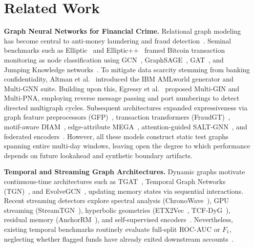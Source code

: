 \documentclass[sigconf,nonacm]{acmart}
\begin{document}
\section{Related Work}
\label{sec:related_work}

\textbf{Graph Neural Networks for Financial Crime.} Relational graph modeling has become central to anti-money laundering and fraud detection~\cite{ferretti2025aml,altman2023ibmaml,weber2019elliptic}. Seminal benchmarks such as Elliptic~\cite{weber2019elliptic} and Elliptic++~\cite{elmougy2023ellipticpp} framed Bitcoin transaction monitoring as node classification using GCN~\cite{kipf2017gcn}, GraphSAGE~\cite{hamilton2017sage}, GAT~\cite{velickovic2018gat}, and Jumping Knowledge networks~\cite{xu2018jk}. To mitigate data scarcity stemming from banking confidentiality, Altman et al.~\cite{altman2023ibmaml} introduced the IBM AMLworld generator and Multi-GNN suite. Building upon this, Egressy et al.~\cite{egressy2024multigraph} proposed Multi-GIN and Multi-PNA, employing reverse message passing and port numberings to detect directed multigraph cycles. Subsequent architectures expanded expressiveness via graph feature preprocessors (GFP)~\cite{blanusa2024gfp}, transaction transformers (FraudGT)~\cite{lin2024fraudgt}, motif-aware DIAM~\cite{ding2024diam}, edge-attribute MEGA~\cite{bilgi2026mega}, attention-guided SALT-GNN~\cite{losavio2026saltgnn}, and federated encoders~\cite{han2026fgegcn,jia2025lmae4eth,asiri2025gcn,alemari2026explainable}. However, all these models construct static test graphs spanning entire multi-day windows, leaving open the degree to which performance depends on future lookahead and synthetic boundary artifacts.

\textbf{Temporal and Streaming Graph Architectures.} Dynamic graphs motivate continuous-time architectures such as TGAT~\cite{xu2020tgat}, Temporal Graph Networks (TGN)~\cite{rossi2020tgn}, and EvolveGCN~\cite{pareja2020evolvegcn}, updating memory states via sequential interactions. Recent streaming detectors explore spectral analysis (ChronoWave~\cite{lin2026chronowave}), GPU streaming (StreamTGN~\cite{streamtgn2026}), hyperbolic geometries (ETX2Vec~\cite{lu2026etx2vec}, TCF-DyG~\cite{li2026tcfdyg}), residual memory (AnchorRM~\cite{anchorrm2026}), and self-supervised encoders~\cite{rico2026taml,chen2025mdst,zhou2025unsup,abolfadl2026kontograph,gounoue2025tempt,su2024temporal}. Nevertheless, existing temporal benchmarks routinely evaluate full-split ROC-AUC or $F_1$, neglecting whether flagged funds have already exited downstream accounts~\cite{digennaro2025amatriciana,heijmans2026robust,oztas2023samld}.
\end{document}
